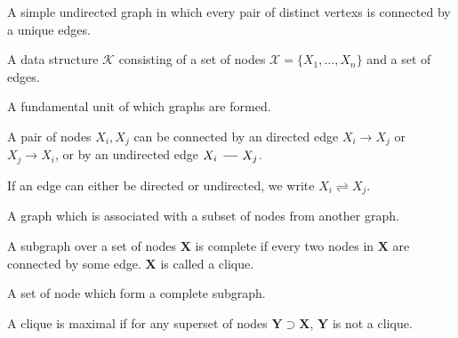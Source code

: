 \DeclareMathOperator*{\undedge}{\mbox{~\textbf{---}\,}}


{%
  A simple undirected \gls{graph} in which every pair of distinct \glspl{vertex} is connected by a unique \glspl{edge}.
}

{%
  A data structure $\mathcal{K}$ consisting of a set of \glspl{node} $\mathcal{X}=\{X_1,\dots,X_n\}$ and a set of \glspl{edge}.
}

{%
  A fundamental unit of which graphs are formed.
}

{%
  A pair of \glspl{node} $X_i,X_j$ can be connected by an directed edge $X_i\to X_j$ or $X_j\to X_i$, or by an undirected edge $X_i\undedge X_j$.

  If an edge can either be directed or undirected, we write $X_i\rightleftharpoons X_j$.
}

{%
  A \gls{graph} which is associated with a subset of nodes from another graph.
}

{%
  A \gls{subgraph} over a set of \glspl{node} $\bm{X}$ is complete if every two nodes in $\bm{X}$ are connected by some \gls{edge}. $\bm{X}$ is called a \gls{clique}.
}

{%
  A set of \gls{node} which form a \gls{complete subgraph}.

  A clique is maximal if for any superset of \glspl{node} $\bm{Y}\supset\bm{X}$, $\bm{Y}$ is not a clique.
}

